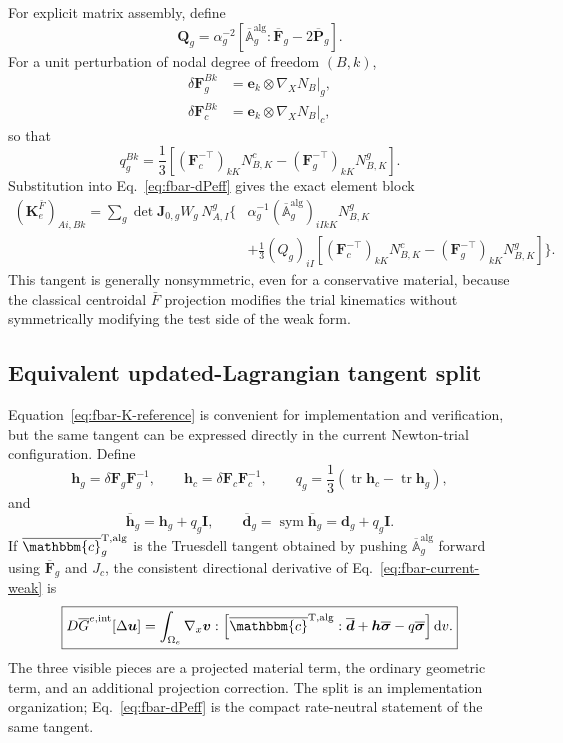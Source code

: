 \documentclass[11pt,a4paper]{article}
\newcommand{\bs}[1]{\boldsymbol{#1}}
\newcommand{\dd}{\mathrm{d}}
\newcommand{\tr}{\operatorname{tr}}
\newcommand{\sym}{\operatorname{sym}}
\newcommand{\I}{\bs{I}}
\newcommand{\F}{\bs{F}}
\newcommand{\Fb}{\overline{\bs{F}}}
\newcommand{\Pb}{\overline{\bs{P}}}
\newcommand{\Ab}{\overline{\mathbb{A}}^{\mathrm{alg}}}
\newcommand{\sigb}{\overline{\bs{\sigma}}}
\newcommand{\cbaralgT}{\overline{\mathbbm{c}}^{\mathrm{T,alg}}}
\newcommand{\vct}[1]{\mathbf{#1}}
\begin{document}
For explicit matrix assembly, define
\begin{equation}
\bs Q_g
=
\alpha_g^{-2}
\left[
\Ab_g:\Fb_g-2\Pb_g
\right].
\label{eq:fbar-Q}
\end{equation}
For a unit perturbation of nodal degree of freedom $(B,k)$,
\begin{align}
\delta\F_g^{Bk}
&=\bs e_k\otimes\nabla_XN_B|_g,\\
\delta\F_c^{Bk}
&=\bs e_k\otimes\nabla_XN_B|_c,
\end{align}
so that
\begin{equation}
q_g^{Bk}
=
\frac{1}{3}
\left[
(\F_c^{-\top})_{kK}N_{B,K}^{c}
-
(\F_g^{-\top})_{kK}N_{B,K}^{g}
\right].
\label{eq:fbar-q-basis}
\end{equation}
Substitution into Eq.~\eqref{eq:fbar-dPeff} gives the exact element block
\begin{equation}
\boxed{
\begin{aligned}
(\vct K_e^{\bar F})_{Ai,Bk}
=\sum_g\det\vct J_{0,g}W_g\,N_{A,I}^{g}
\bigg\{&
\alpha_g^{-1}(\Ab_g)_{iI kK}N_{B,K}^{g}\\
&+\frac{1}{3}(Q_g)_{iI}
\left[
(\F_c^{-\top})_{kK}N_{B,K}^{c}
-(\F_g^{-\top})_{kK}N_{B,K}^{g}
\right]
\bigg\}.
\end{aligned}
}
\label{eq:fbar-K-reference}
\end{equation}
This tangent is generally nonsymmetric, even for a conservative material, because the classical centroidal $\bar F$ projection modifies the trial kinematics without symmetrically modifying the test side of the weak form.

\subsection{Equivalent updated-Lagrangian tangent split}

Equation~\eqref{eq:fbar-K-reference} is convenient for implementation and verification, but the same tangent can be expressed directly in the current Newton-trial configuration. Define
\begin{equation}
\bs h_g=\delta\F_g\F_g^{-1},
\qquad
\bs h_c=\delta\F_c\F_c^{-1},
\qquad
q_g=\frac{1}{3}\left(\tr\bs h_c-\tr\bs h_g\right),
\end{equation}
and
\begin{equation}
\overline{\bs h}_g=\bs h_g+q_g\I,
\qquad
\overline{\bs d}_g=\sym\overline{\bs h}_g=\bs d_g+q_g\I.
\end{equation}
If $\cbaralgT_g$ is the Truesdell tangent obtained by pushing $\Ab_g$ forward using $\Fb_g$ and $J_c$, the consistent directional derivative of Eq.~\eqref{eq:fbar-current-weak} is
\begin{equation}
\boxed{
D\overline G^{e,\mathrm{int}}[\Delta\bs u]
=
\int_{\Omega_e}
\nabla_x\bs v:
\left[
\cbaralgT:\overline{\bs d}
+\bs h\sigb
-q\sigb
\right]\dd v.
}
\label{eq:fbar-current-linearization}
\end{equation}
The three visible pieces are a projected material term, the ordinary geometric term, and an additional projection correction. The split is an implementation organization; Eq.~\eqref{eq:fbar-dPeff} is the compact rate-neutral statement of the same tangent.
\end{document}
